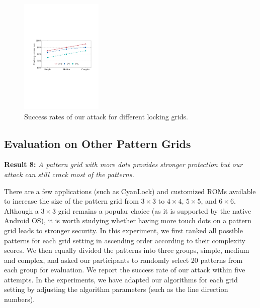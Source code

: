         \begin{figure}[!t]
            \centering
            \includegraphics[width=0.35\textwidth]{fig/scalability.pdf}
            \vspace{-3mm}
            \caption{Success rates of our attack for different locking grids.}
            \vspace{-2mm}
            \label{fig:scalability}
            \vspace{-2mm}
        \end{figure}

    \subsection{Evaluation on Other Pattern Grids\label{sec:scalability}}
    \noindent \textbf{Result 8:} \emph{A pattern grid with more dots provides stronger protection but our attack can still crack most of the patterns.}

        There are a few applications (such as CyanLock) and customized ROMs available to increase the size of the pattern grid from $3\times3$ to $4\times4$, $5\times5$, and $6\times6$.
        Although a $3 \times 3$ grid remains
        a popular choice (as it is supported by the native Android OS), it is worth studying whether
        having more touch dots on a pattern grid leads to stronger security. In this
        experiment, we first ranked all possible patterns for each grid setting in
        ascending order according to their complexity scores. We then equally
        divided the patterns into three groups, simple, medium and complex,
        and asked our participants to randomly select 20 patterns from each group for evaluation. We
        report the success rate of our attack within five attempts. In the experiments, we have adapted our algorithms for each grid setting
        by adjusting the algorithm parameters (such as the line direction numbers).


